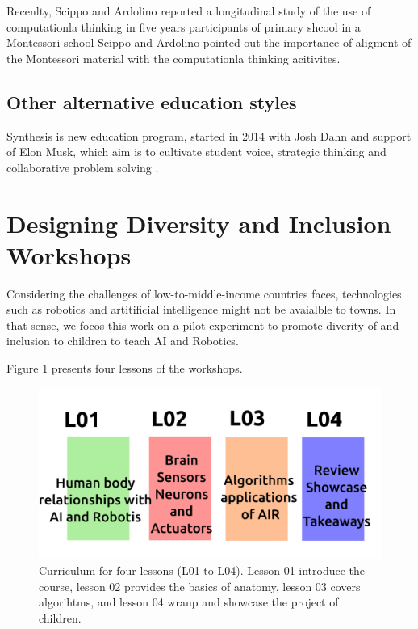 \documentclass[conference]{IEEEtran}
\begin{document}
Recenlty, Scippo and Ardolino reported a longitudinal study of the use of computationla thinking in five years participants of primary shcool in a Montessori school \cite{ScippoArdolino2021}
Scippo and Ardolino pointed out the importance of aligment of the Montessori material with the computationla thinking acitivites. 

\subsection{Other alternative education styles}
Synthesis is new education program, started in 2014 with Josh Dahn and support of Elon Musk, which aim is to cultivate student voice, strategic thinking and collaborative problem solving \cite{synthesis2022}.

\section{Designing Diversity and Inclusion  Workshops}
Considering the challenges of low-to-middle-income countries faces, technologies such as robotics and artitificial intelligence might not be avaialble to towns. 
In that sense, we focos this work on a pilot experiment to promote diverity of and inclusion to children to teach AI and Robotics. 

Figure \ref{fig:curriculum} presents four lessons of the workshops.
\begin{figure}[htbp]
    \centerline{\includegraphics{curriculum-design/versions/drawing-v00.png}}
    \caption{Curriculum for four lessons (L01 to L04). 
    Lesson 01 introduce the course, 
    lesson 02 provides the basics of anatomy, 
    lesson 03 covers algorihtms, and 
    lesson 04 wraup and showcase the project of children.
    }
    \label{fig:curriculum}
\end{figure}
\end{document}
